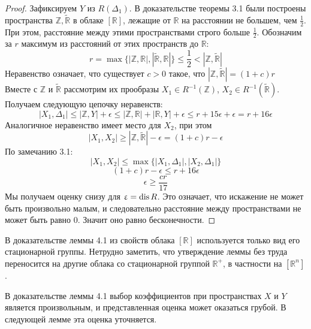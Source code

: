 \begin{proof}
	Зафиксируем $Y$ из $R(\Delta_1)$. 
	В доказательстве теоремы 3.1 были построены пространства $\mathbb{Z}, \widetilde{\mathbb{R}}$ в облаке $[\mathbb{R}]$, лежащие от $\mathbb{R}$ на расстоянии не большем, чем $\frac{1}{2}$. При этом, расстояние между этими пространствами строго больше $\frac{1}{2}$. Обозначим за $r$ максимум из расстояний от этих пространств до $\mathbb{R}$:
	$$r = \max\big\{|\mathbb{Z}, \mathbb{R}|,|\widetilde{\mathbb{R}}, \mathbb{R}|\big\}\le \frac{1}{2} < |\mathbb{Z}, \widetilde{\mathbb{R}}|$$
	Неравенство означает, что существует $c > 0$ такое, что $|\mathbb{Z}, \widetilde{\mathbb{R}}| = (1 + c)r$
	\\
	Вместе с $\mathbb{Z}$ и $ \widetilde{\mathbb{R}}$ рассмотрим их прообразы $X_1 \in R^{-1}(\mathbb{Z})$, $ X_2 \in R^{-1}(\widetilde{\mathbb{R}})$.
	\\
	Получаем следующую цепочку неравенств:
	$$|X_1, \Delta_1| \le |\mathbb{Z}, Y| + \epsilon \le |\mathbb{Z}, \mathbb{R}| + |\mathbb{R}, Y| +\epsilon \le r + 15\epsilon + \epsilon = r + 16\epsilon$$
	Аналогичное неравенство имеет место для $X_2$, при этом
	$$|X_1, X_2|  \ge |\mathbb{Z}, \widetilde{\mathbb{R}}| - \epsilon = (1+c)r - \epsilon$$
	По замечанию 3.1:
	$$|X_1, X_2| \le \max\big\{ |X_1, \Delta_1|, |X_2, \Delta_1| \big\} $$
	$$(1+c)r - \epsilon\le r + 16\epsilon$$
	$$\epsilon \ge \frac{cr}{17}$$
	Мы получаем оценку снизу для $\upvarepsilon = \operatorname{dis} R$. Это означает, что искажение не может быть произвольно малым, и следовательно расстояние между пространствами не может быть равно 0. Значит оно равно бесконечности.
	
\end{proof}

\begin{remark}
	В доказательстве леммы 4.1 из свойств облака $[\mathbb{R}]$ используется только вид его стационарной группы. Нетрудно заметить, что утверждение леммы без труда переносится на другие облака со стационарной группой $\mathbb{R}^+$, в частности на $[\mathbb{R}^n]$.
\end{remark}

\begin{remark}
	В доказательстве леммы 4.1 выбор коэффициентов при пространствах $X$ и $Y$ является произвольным, и представленная оценка может оказаться грубой. В следующей лемме эта оценка уточняется.
\end{remark}

